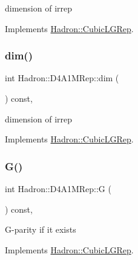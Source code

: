 dimension of irrep 

Implements \mbox{\hyperlink{structHadron_1_1CubicLGRep_a3acbaea26503ed64f20df693a48e4cdd}{Hadron\+::\+Cubic\+L\+G\+Rep}}.

\mbox{\label{structHadron_1_1D4A1MRep_ae14f6a295b89553d56114e5727e631da}} 
\subsubsection{\texorpdfstring{dim()}{dim()}\hspace{0.1cm}{\footnotesize\ttfamily [2/2]}}
{\footnotesize\ttfamily int Hadron\+::\+D4\+A1\+M\+Rep\+::dim (\begin{DoxyParamCaption}{ }\end{DoxyParamCaption}) const\hspace{0.3cm}{\ttfamily [inline]}, {\ttfamily [virtual]}}

dimension of irrep 

Implements \mbox{\hyperlink{structHadron_1_1CubicLGRep_a3acbaea26503ed64f20df693a48e4cdd}{Hadron\+::\+Cubic\+L\+G\+Rep}}.

\mbox{\label{structHadron_1_1D4A1MRep_af3514ad54f3b71a3e233360843f8d189}} 
\subsubsection{\texorpdfstring{G()}{G()}\hspace{0.1cm}{\footnotesize\ttfamily [1/2]}}
{\footnotesize\ttfamily int Hadron\+::\+D4\+A1\+M\+Rep\+::G (\begin{DoxyParamCaption}{ }\end{DoxyParamCaption}) const\hspace{0.3cm}{\ttfamily [inline]}, {\ttfamily [virtual]}}

G-\/parity if it exists 

Implements \mbox{\hyperlink{structHadron_1_1CubicLGRep_ace26f7b2d55e3a668a14cb9026da5231}{Hadron\+::\+Cubic\+L\+G\+Rep}}.

\mbox{\label{structHadron_1_1D4A1MRep_af3514ad54f3b71a3e233360843f8d189}} 
